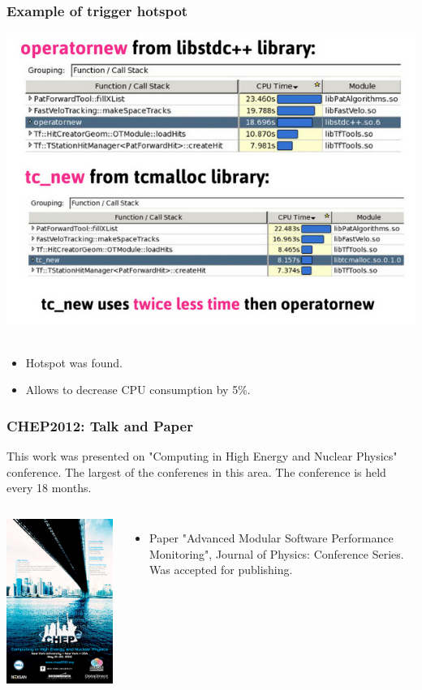 \documentclass{beamer}
\begin{document}
\begin{frame}
\frametitle{Example of trigger hotspot}
\includegraphics[width=.7\textwidth]{images/hlt.png}\\~\\
\begin{itemize}
  \item Hotspot was found.
  \item Allows to decrease CPU consumption by 5\%.
\end{itemize}
\end{frame}
\begin{frame}
\frametitle{CHEP2012: Talk and Paper}
This work was presented on "Computing in High Energy and Nuclear Physics" conference.
The largest of the conferenes in this area. The conference is held every 18 months.
\begin{columns}[l]
\includegraphics[height=.6\textheight]{images/chep.png}
\begin{itemize}
    \item Paper "Advanced Modular Software Performance Monitoring", Journal of Physics: Conference Series. Was accepted for publishing.
\end{itemize}
\end{columns}
\end{frame}
\end{document}
